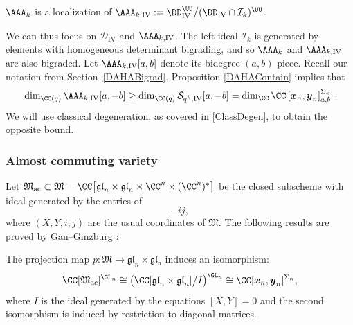 \begin{cor}\label{ALocCor}
$\AAA_k$ is a localization of $\AAA_{k,\mathrm{IV}}:=\DD_{\mathrm{IV}}^\UU\big/(\DD_{\mathrm{IV}}\cap\mathcal{I}_k)^\UU$.
\end{cor}

We can thus focus on $\mathcal{D}_{\mathrm{IV}}$ and $\AAA_{k,\mathrm{IV}}$.
The left ideal $\mathcal{I}_k$ is generated by elements with homogeneous determinant bigrading, and so $\AAA_k$ and $\AAA_{k,\mathrm{IV}}$ are also bigraded.
Let $\AAA_{k,\mathrm{IV}}[a,b]$ denote its bidegree $(a,b)$ piece.
Recall our notation from Section~\ref{DAHABigrad}.
Proposition \ref{DAHAContain} implies that
\begin{equation}
\dim_{\CC(q)}\AAA_{k,\mathrm{IV}}[a,-b]\ge\dim_{\CC(q)}\mathcal{S}_{q^k,\mathrm{IV}}[a,-b]=\dim_\CC\CC\left[ \boldsymbol{x}_n,\boldsymbol{y}_n \right]^{\Sigma_n}_{a,b}.
\label{ABig}
\end{equation}
We will use classical degeneration, as covered in \ref{ClassDegen}, to obtain the opposite bound.

\subsubsection{Almost commuting variety}
Let $\mathfrak{M}_{\mathrm{ac}}\subset\mathfrak{M}=\CC\bigl[\mathfrak{gl}_n\times\mathfrak{gl}_n\times\CC^n\times(\CC^n)^*\bigr]$ be the closed subscheme with ideal generated by the entries of
\begin{equation}
[X,Y]-ij,
\label{ACEquation}
\end{equation}
where $(X,Y,i,j)$ are the usual coordinates of $\mathfrak{M}$.
The following results are proved by Gan--Ginzburg \cite{GanGinz}:
\begin{thm}
The projection map $p:\mathfrak{M}\to\mathfrak{gl}_n\times\mathfrak{gl_n}$ induces an isomorphism:
\begin{equation}
\CC[\mathfrak{M}_{\mathrm{ac}}]^{\GL_n}\cong\bigl(\CC[\mathfrak{gl}_n\times\mathfrak{gl}_n]\big/I\bigr)^{\GL_n}
\cong \CC[\boldsymbol{x}_n,\boldsymbol{y}_n]^{\Sigma_n},
\label{ACIso}
\end{equation}
where $I$ is the ideal generated by the equations $[X,Y]=0$ and the second isomorphism is induced by restriction to diagonal matrices.
\end{thm}

